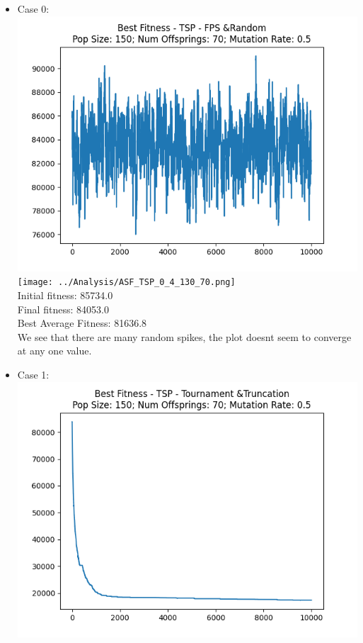 \documentclass[12pt]{report} %
\begin{document}
\begin{itemize}

	\item Case 0:\\
	      \includegraphics[scale=0.5]{../Analysis/BSF_TSP_0_4_150_70.png}
	      \texttt{[image: ../Analysis/ASF\_TSP\_0\_4\_130\_70.png]}
	      \\Initial fitness:  85734.0
	      \\Final fitness:  84053.0
	      \\Best Average Fitness: 81636.8
	      \\We see that there are many random spikes, the plot doesnt seem to converge at any one value.
	\item Case 1:\\
	      \includegraphics[scale=0.5]{../Analysis/BSF_TSP_2_3_150_70.png}

\end{itemize}
\end{document}
